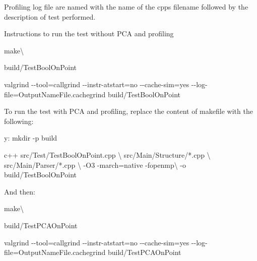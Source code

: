 Profiling log file are named with the name of the cpp\textquotesingle{}s filename followed by the description of test performed.

Instructions to run the test without P\+CA and profiling
\begin{DoxyPre}
\begin{DoxyItemize}
\item make\textbackslash{}
\item build/TestBoolOnPoint
\item valgrind -\/-\/tool=callgrind -\/-\/instr-\/atstart=no -\/-\/cache-\/sim=yes -\/-\/log-\/file=OutputNameFile.cachegrind build/TestBoolOnPoint

\end{DoxyItemize}\end{DoxyPre}



\begin{DoxyPre}To run the test with PCA and profiling, replace the content of makefile with the following:

\begin{DoxyPre}\end{DoxyPre}
\end{DoxyPre}



\begin{DoxyPre}
\begin{DoxyPre}y:
    mkdir -\/p build\end{DoxyPre}
\end{DoxyPre}



\begin{DoxyPre}
\begin{DoxyPre}    c++                     src/Test/TestBoolOnPoint.cpp \textbackslash{}
                        src/Main/Structure/*.cpp \textbackslash{}
                        src/Main/Parser/*.cpp \textbackslash{}
                         -\/O3 -\/march=native -\/fopenmp\textbackslash{}
                        -\/o  build/TestBoolOnPoint
    \end{DoxyPre}
 And then\+: 
\begin{DoxyPre}
\begin{DoxyItemize}
\item make\textbackslash{}
\item build/TestPCAOnPoint
\item valgrind -\/-\/tool=callgrind -\/-\/instr-\/atstart=no -\/-\/cache-\/sim=yes -\/-\/log-\/file=OutputNameFile.cachegrind build/TestPCAOnPoint


\end{DoxyItemize}\end{DoxyPre}
\end{DoxyPre}
